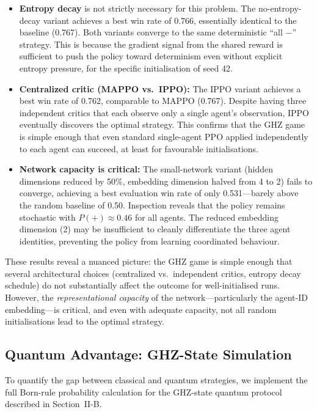 \documentclass[conference]{IEEEtran}
\begin{document}
\begin{itemize}
    \item \textbf{Entropy decay} is not strictly necessary for this problem. The no-entropy-decay variant achieves a best win rate of 0.766, essentially identical to the baseline (0.767). Both variants converge to the same deterministic ``all $-$'' strategy. This is because the gradient signal from the shared reward is sufficient to push the policy toward determinism even without explicit entropy pressure, for the specific initialisation of seed 42.

    \item \textbf{Centralized critic (MAPPO vs.\ IPPO):} The IPPO variant achieves a best win rate of 0.762, comparable to MAPPO (0.767). Despite having three independent critics that each observe only a single agent's observation, IPPO eventually discovers the optimal strategy. This confirms that the GHZ game is simple enough that even standard single-agent PPO applied independently to each agent can succeed, at least for favourable initialisations.

    \item \textbf{Network capacity is critical:} The small-network variant (hidden dimensions reduced by 50\%, embedding dimension halved from 4 to 2) fails to converge, achieving a best evaluation win rate of only 0.531---barely above the random baseline of 0.50. Inspection reveals that the policy remains stochastic with $P(+) \approx 0.46$ for all agents. The reduced embedding dimension (2) may be insufficient to cleanly differentiate the three agent identities, preventing the policy from learning coordinated behaviour.
\end{itemize}

These results reveal a nuanced picture: the GHZ game is simple enough that several architectural choices (centralized vs.\ independent critics, entropy decay schedule) do not substantially affect the outcome for well-initialised runs. However, the \emph{representational capacity} of the network---particularly the agent-ID embedding---is critical, and even with adequate capacity, not all random initialisations lead to the optimal strategy.

\subsection{Quantum Advantage: GHZ-State Simulation}

To quantify the gap between classical and quantum strategies, we implement the full Born-rule probability calculation for the GHZ-state quantum protocol described in Section~II-B.
\end{document}
